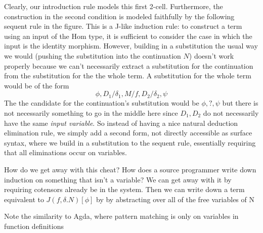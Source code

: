\documentclass{article}
\begin{document}
Clearly, our introduction rule models this first 2-cell. Furthermore,
the construction in the second condition is modeled faithfully by the
following sequent rule in the figure. This is a J-like induction rule:
to construct a term using an input of the Hom type, it is sufficient
to consider the case in which the input is the identity morphism.
%
However, building in a substitution the usual way we would (pushing
the substitution into the continuation $N$) doesn't work properly
because we can't necessarily extract a substitution for the
continuation from the substitution for the the whole term. A
substitution for the whole term would be of the form
\[\phi,D_1/\delta_1,M/f,D_2/\delta_2,\psi\]
The the candidate for the continuation's substitution would be
$\phi,?,\psi$ but there is not necessarily something to go in the
middle here since $D_1,D_2$ do not necessarily have the same
\emph{input variable}. So instead of having a nice natural deduction
elimination rule, we simply add a second form, not directly accessible
as surface syntax, where we build in a substitution to the sequent
rule, essentially requiring that all eliminations occur on variables.

How do we get away with this cheat? How does a source programmer write
down induction on something that isn't a variable? We can get away
with it by requiring cotensors already be in the system. Then we can
write down a term equivalent to $J(f,\delta.N)[\phi]$ by by
abstracting over all of the free variables of N

Note the
similarity to Agda, where pattern matching is only on variables in
function definitions
\end{document}
